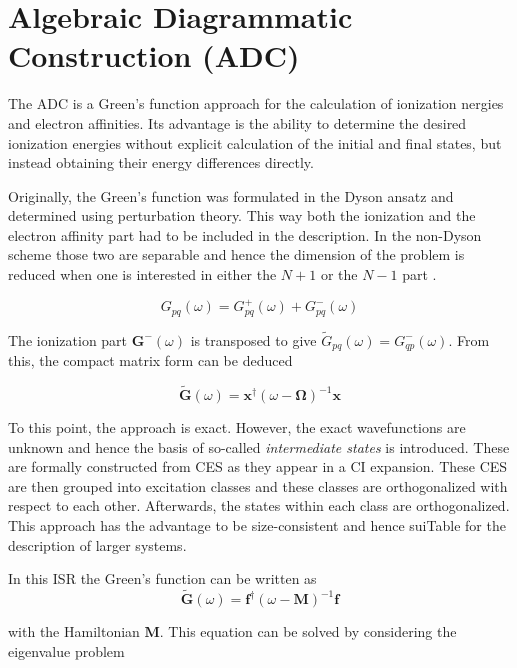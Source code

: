 \chapter{Algebraic Diagrammatic Construction (ADC)}

The \ac{ADC} is a Green's function approach for the calculation of ionization
nergies and electron affinities.
Its advantage is the ability to determine the desired ionization energies
without explicit calculation of the initial and final states, but instead
obtaining their energy differences directly.

Originally, the Green's function was formulated in the Dyson ansatz and
determined using perturbation theory. This way both the ionization and the
electron affinity part had to be included in the description. In the non-Dyson
scheme those two are separable and hence the dimension of the problem is reduced
when one is interested in either the $N+1$ or the $N-1$ part \cite{Schirmer98}.

\begin{equation}
 G_{pq}(\omega) = G^+_{pq}(\omega) + G^-_{pq}(\omega)
\end{equation}

The ionization part $\mathbf{G^-}(\omega)$ is transposed to give
$\tilde{G}_{pq}(\omega) = G^-_{qp}(\omega)$. From this, the compact matrix
form can be deduced

\begin{equation}\label{matrixspec}
\mathbf{\tilde{G}}(\omega) = \mathbf{x}^\dagger(\omega-\mathbf{\Omega})^{-1}\mathbf{x}
\end{equation}

To this point, the approach is exact. However, the exact wavefunctions are unknown
and hence the basis of so-called \emph{intermediate states} is introduced. These
are formally constructed from \ac{CES} as they appear in a
\ac{CI} expansion. These \ac{CES} are then grouped into excitation classes
and these classes are orthogonalized with respect to each other. Afterwards,
the states within each class are orthogonalized. 
This approach has the advantage to be size-consistent and hence
suiTable for the description of larger systems. \cite{Mertins96_1}

In this \ac{ISR} the Green's function can be written as
\begin{equation}\label{isradc}
\mathbf{\tilde{G}}(\omega) = \mathbf{f}^\dagger(\omega-\mathbf{M})^{-1}\mathbf{f}
\end{equation}

with the Hamiltonian $\mathbf{M}$.
This equation can be solved by
considering the eigenvalue problem

